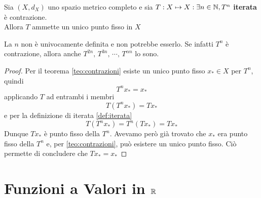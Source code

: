 \begin{theorem}
	\label{teo:teo_iterata_contraz}
	Sia $(X,d_X)$ uno spazio metrico completo e sia $T:X\mapsto X : \exists n \in \mathbb{N}, T^n$ \textbf{iterata} è contrazione.\\
	Allora $T$ ammette un unico punto fisso in $X$
	\begin{note}
		La $n$ non è univocamente definita e non potrebbe esserlo. Se infatti $T^n$ è contrazione, allora anche $T^{2n},\, T^{3n},\, \cdots,\, T^{\alpha n}$ lo sono.
	\end{note}
	\begin{proof}
		Per il teorema \ref{teo:contrazioni} esiste un unico punto fisso $x_* \in X$ per $T^n$, quindi
		$$T^nx_* = x_*$$
		applicando $T$ ad entrambi i membri
		$$T(T^{n}x_*) = Tx_*$$
		e per la definizione di iterata \ref{def:iterata}
		$$T(T^{n}x_*) = T^n(Tx_*) = Tx_*$$
		Dunque $Tx_*$ è punto fisso della $T^n$. Avevamo però già trovato che $x_*$ era punto fisso della $T^n$ e, per \ref{teo:contrazioni}, può esistere un unico punto fisso. Ciò permette di concludere che $Tx_* = x_*$
	\end{proof}
\end{theorem}

\section{Funzioni a Valori in $\protect\mathbb{R}$}
